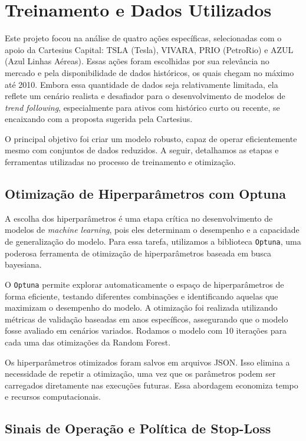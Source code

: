 \documentclass{article}
\begin{document}
\newpage

\section{Treinamento e Dados Utilizados}

Este projeto focou na análise de quatro ações específicas, selecionadas com o apoio da Cartesius Capital: TSLA (Tesla), VIVARA, PRIO (PetroRio) e AZUL (Azul Linhas Aéreas). Essas ações foram escolhidas por sua relevância no mercado e pela disponibilidade de dados históricos, os quais chegam no máximo até 2010. Embora essa quantidade de dados seja relativamente limitada, ela reflete um cenário realista e desafiador para o desenvolvimento de modelos de \textit{trend following}, especialmente para ativos com histórico curto ou recente, se encaixando com a proposta sugerida pela Cartesius.

O principal objetivo foi criar um modelo robusto, capaz de operar eficientemente mesmo com conjuntos de dados reduzidos. A seguir, detalhamos as etapas e ferramentas utilizadas no processo de treinamento e otimização.

\subsection{Otimização de Hiperparâmetros com Optuna}

A escolha dos hiperparâmetros é uma etapa crítica no desenvolvimento de modelos de \textit{machine learning}, pois eles determinam o desempenho e a capacidade de generalização do modelo. Para essa tarefa, utilizamos a biblioteca \texttt{Optuna}, uma poderosa ferramenta de otimização de hiperparâmetros baseada em busca bayesiana.

O \texttt{Optuna} permite explorar automaticamente o espaço de hiperparâmetros de forma eficiente, testando diferentes combinações e identificando aquelas que maximizam o desempenho do modelo. A otimização foi realizada utilizando métricas de validação baseadas em anos específicos, assegurando que o modelo fosse avaliado em cenários variados. Rodamos o modelo com 10 iterações para cada uma das otimizações da Random Forest.

Os hiperparâmetros otimizados foram salvos em arquivos JSON. Isso elimina a necessidade de repetir a otimização, uma vez que os parâmetros podem ser carregados diretamente nas execuções futuras. Essa abordagem economiza tempo e recursos computacionais.

\subsection{Sinais de Operação e Política de Stop-Loss}
\end{document}
